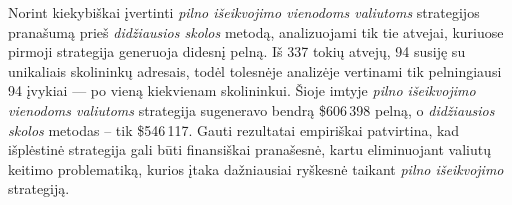\documentclass[]{VUMIFTemplateClass}
\begin{document}

Norint kiekybiškai įvertinti \textit{pilno išeikvojimo vienodoms valiutoms} strategijos pranašumą prieš \textit{didžiausios skolos} metodą, analizuojami tik tie atvejai, kuriuose pirmoji strategija generuoja didesnį pelną. Iš 337 tokių atvejų, 94 susiję su unikaliais skolininkų adresais, todėl tolesnėje analizėje vertinami tik pelningiausi 94 įvykiai — po vieną kiekvienam skolininkui. Šioje imtyje \textit{pilno išeikvojimo vienodoms valiutoms} strategija sugeneravo bendrą \$606\,398 pelną, o \textit{didžiausios skolos} metodas – tik \$546\,117. Gauti rezultatai empiriškai patvirtina, kad išplėstinė strategija gali būti finansiškai pranašesnė, kartu eliminuojant valiutų keitimo problematiką, kurios įtaka dažniausiai ryškesnė taikant \textit{pilno išeikvojimo} strategiją.
\end{document}
